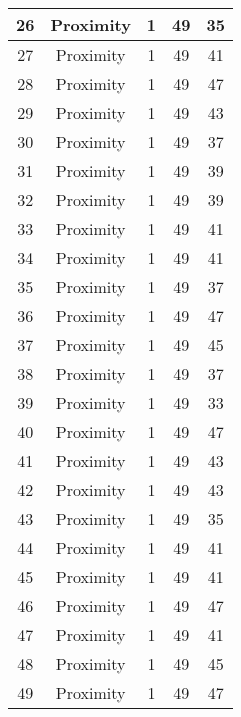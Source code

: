 \documentclass[results.tex]{subfiles}
\begin{document}
\begin{center}
\begin{tabular}{| c || c | c | c | c |}
    \hline
    26 & Proximity & 1 & 49 & 35 \\ 
    \hline
    27 & Proximity & 1 & 49 & 41 \\ 
    \hline
    28 & Proximity & 1 & 49 & 47 \\ 
    \hline
    29 & Proximity & 1 & 49 & 43 \\ 
    \hline
    30 & Proximity & 1 & 49 & 37 \\ 
    \hline
    31 & Proximity & 1 & 49 & 39 \\ 
    \hline
    32 & Proximity & 1 & 49 & 39 \\ 
    \hline
    33 & Proximity & 1 & 49 & 41 \\ 
    \hline
    34 & Proximity & 1 & 49 & 41 \\ 
    \hline
    35 & Proximity & 1 & 49 & 37 \\ 
    \hline
    36 & Proximity & 1 & 49 & 47 \\ 
    \hline
    37 & Proximity & 1 & 49 & 45 \\ 
    \hline
    38 & Proximity & 1 & 49 & 37 \\ 
    \hline
    39 & Proximity & 1 & 49 & 33 \\ 
    \hline
    40 & Proximity & 1 & 49 & 47 \\ 
    \hline
    41 & Proximity & 1 & 49 & 43 \\ 
    \hline
    42 & Proximity & 1 & 49 & 43 \\ 
    \hline
    43 & Proximity & 1 & 49 & 35 \\ 
    \hline
    44 & Proximity & 1 & 49 & 41 \\ 
    \hline
    45 & Proximity & 1 & 49 & 41 \\ 
    \hline
    46 & Proximity & 1 & 49 & 47 \\ 
    \hline
    47 & Proximity & 1 & 49 & 41 \\ 
    \hline
    48 & Proximity & 1 & 49 & 45 \\ 
    \hline
    49 & Proximity & 1 & 49 & 47 \\ 
    \hline   \end{tabular}
\end{center}
\end{document}
